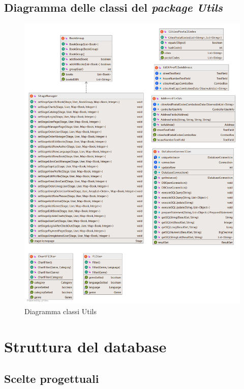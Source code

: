 \documentclass[a4paper,11pt]{report}
\begin{document}
\clearpage

\section{Diagramma delle classi del \textit{package Utils}}
\begin{figure}[h!]
	\centering
	\hspace*{-0.5in}
	\includegraphics[width=1.1\linewidth]{Class diagrams/Package Utils.png}
	\caption{Diagramma classi Utils}
\end{figure}



\clearpage

\chapter{Struttura del database}\label{database}
\section{Scelte progettuali}
\end{document}
